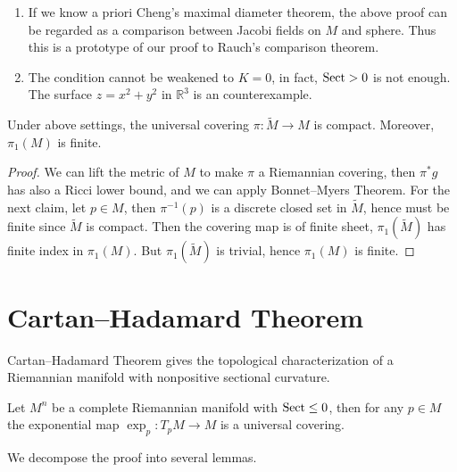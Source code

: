\begin{rem}
    \begin{enumerate}[(1)]
        \item If we know a priori Cheng's maximal diameter theorem, the above proof can be regarded as a comparison between Jacobi fields on $M$ and sphere.
        Thus this is a prototype of our proof to Rauch's comparison theorem.
        \item The condition cannot be weakened to $K=0$, in fact, $\operatorname{Sect}>0$ is not enough.
        The surface $z=x^2+y^2$ in $\mathbb{R}^3$ is an counterexample.
    \end{enumerate}
\end{rem}

\begin{cor}
    Under above settings, the universal covering $\pi:\tilde{M}\to M$ is compact.
    Moreover, $\pi_1(M)$ is finite.
\end{cor}
\begin{proof}
    We can lift the metric of $M$ to make $\pi$ a Riemannian covering, then $\pi^*g$ has also a Ricci lower bound, and we can apply Bonnet--Myers Theorem.
    For the next claim, let $p\in M$, then $\pi^{-1}(p)$ is a discrete closed set in $\tilde{M}$, hence must be finite since $\tilde{M}$ is compact.
    Then the covering map is of finite sheet, $\pi_1(\tilde{M})$ has finite index in $\pi_1(M)$.
    But $\pi_1(\tilde{M})$ is trivial, hence $\pi_1(M)$ is finite.
\end{proof}

\section{Cartan--Hadamard Theorem}

Cartan--Hadamard Theorem gives the topological characterization of a Riemannian manifold with nonpositive sectional curvature.

\begin{thm}
    Let $M^n$ be a complete Riemannian manifold with $\operatorname{Sect}\leq 0$, then for any $p\in M$ the exponential map $\exp_p:T_pM\to M$ is a universal covering.
\end{thm}

We decompose the proof into several lemmas.

